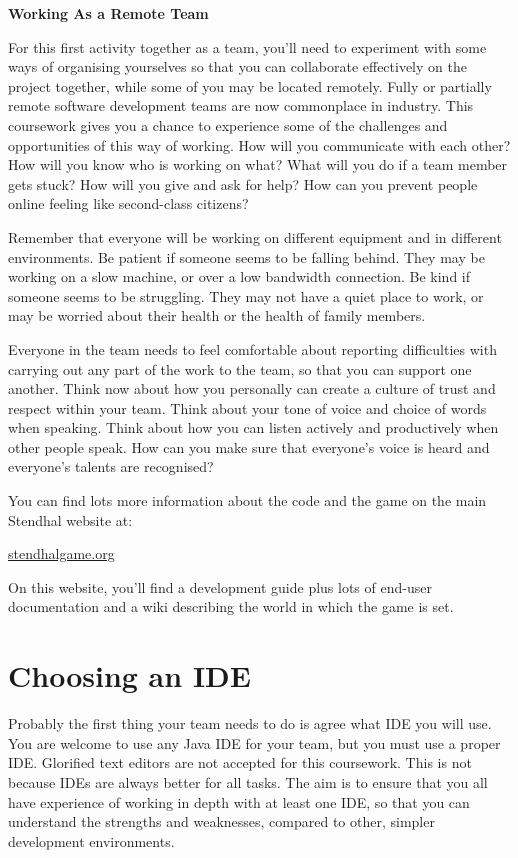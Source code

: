 \documentclass[
]{book}
\begin{document}
\textbf{Working As a Remote Team}

For this first activity together as a team, you'll need to experiment with some ways of organising yourselves so that you can collaborate effectively on the project together, while some of you may be located remotely. Fully or partially remote software development teams are now commonplace in industry. This coursework gives you a chance to experience some of the challenges and opportunities of this way of working. How will you communicate with each other? How will you know who is working on what? What will you do if a team member gets stuck? How will you give and ask for help? How can you prevent people online feeling like second-class citizens?

Remember that everyone will be working on different equipment and in different environments. Be patient if someone seems to be falling behind. They may be working on a slow machine, or over a low bandwidth connection. Be kind if someone seems to be struggling. They may not have a quiet place to work, or may be worried about their health or the health of family members.

Everyone in the team needs to feel comfortable about reporting difficulties with carrying out any part of the work to the team, so that you can support one another. Think now about how you personally can create a culture of trust and respect within your team. Think about your tone of voice and choice of words when speaking. Think about how you can listen actively and productively when other people speak. How can you make sure that everyone's voice is heard and everyone's talents are recognised?

You can find lots more information about the code and the game on the main Stendhal website at:

\href{https://stendhalgame.org/}{stendhalgame.org}

On this website, you'll find a development guide plus lots of end-user documentation and a wiki describing the world in which the game is set.

\hypertarget{idelike}{%
\section{Choosing an IDE}\label{idelike}}

Probably the first thing your team needs to do is agree what IDE you will use.
You are welcome to use any Java IDE for your team, but you must use a proper IDE. Glorified text editors are not accepted for this coursework. This is not because IDEs are always better for all tasks. The aim is to ensure that you all have experience of working in depth with at least one IDE, so that you can understand the strengths and weaknesses, compared to other, simpler development environments.
\end{document}
